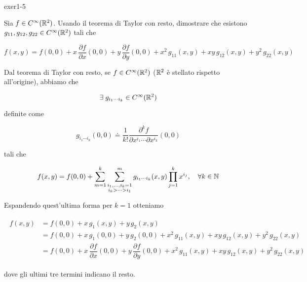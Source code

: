 {exer1-5}
{
Sia $ f \in C^{\infty}(\mathbb{R}^{2}) $. Usando il teorema di Taylor con resto, dimostrare che esistono $ g_{11},g_{12},g_{22} \in C^{\infty}(\mathbb{R}^{2}) $ tali che

\begin{equation}
	f(x,y) = f(0,0) + x \, \dfrac{\partial f}{\partial x} (0,0) + y \, \dfrac{\partial f}{\partial y} (0,0) + x^{2} \, g_{11}(x,y) + x y \, g_{12}(x,y) + y^{2} \, g_{22}(x,y)
\end{equation}
}
{
Dal teorema di Taylor con resto, se $ f \in C^{\infty} (\mathbb{R}^{2}) $ ($ \mathbb{R}^{2} $ è stellato rispetto all'origine), abbiamo che

\begin{equation}
	\exists \; g_{i_{1} \cdots i_{k}} \in C^{\infty} (\mathbb{R}^{2})
\end{equation}

definite come

\begin{equation}
	g_{i_{1} \cdots i_{k}} (0,0) \doteq \dfrac{1}{k!} \dfrac{\partial^{k} f}{\partial x^{i_{1}} \cdots \partial x^{i_{k}}} (0,0)
\end{equation}

tali che

\begin{equation}
	f(x,y) = f(0,0) + \sum_{m=1}^{k} \sum_{\substack{i_{1},\dots,i_{k}=1 \\ {i_{k}} > \cdots > i_{1}}}^{m} g_{i_{1} \cdots i_{k}} (x,y) \prod_{j=1}^{k} x^{i_{j}} %
	\qcomma \forall k \in \N
\end{equation}

Espandendo quest'ultima forma per $ k=1 $ otteniamo

\begin{align}
	\begin{split}
		f(x,y) &= f(0,0) + x \, g_{1} (x,y) + y \, g_{2} (x,y) \\
		&= f(0,0) + x \, g_{1} (0,0) + y \, g_{2} (0,0) + x^{2} \, g_{11}(x,y) + x y \, g_{12}(x,y) + y^{2} \, g_{22}(x,y) \\
		&= f(0,0) + x \, \dfrac{\partial f}{\partial x} (0,0) + y \, \dfrac{\partial f}{\partial y} (0,0) + x^{2} \, g_{11}(x,y) + x y \, g_{12}(x,y) + y^{2} \, g_{22}(x,y)
	\end{split}
\end{align}

dove gli ultimi tre termini indicano il resto.
}


